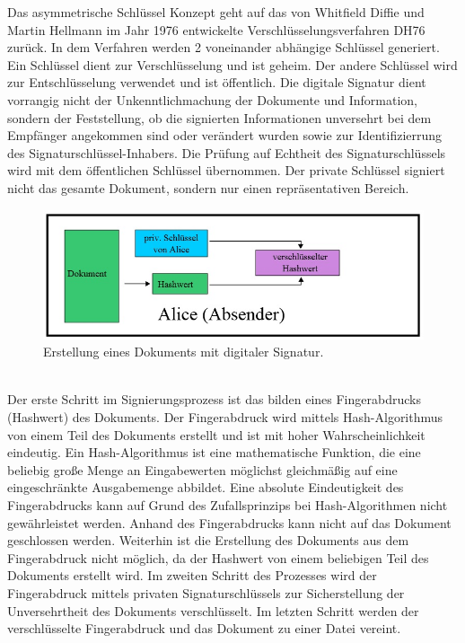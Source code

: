 Das asymmetrische Schlüssel Konzept geht auf das von Whitfield Diffie 
und Martin Hellmann im Jahr 1976 entwickelte Verschlüsselungsverfahren 
DH76 zurück. In dem Verfahren werden 2 voneinander abhängige Schlüssel 
generiert. Ein Schlüssel dient zur Verschlüsselung und ist geheim. Der 
andere Schlüssel wird zur Entschlüsselung verwendet und ist öffentlich. 
Die digitale Signatur dient vorrangig nicht der Unkenntlichmachung der 
Dokumente und Information, sondern der Feststellung, ob die signierten 
Informationen unversehrt bei dem Empfänger angekommen sind oder verändert 
wurden sowie zur Identifizierrung des Signaturschlüssel-Inhabers. Die 
Prüfung auf Echtheit des Signaturschlüssels wird mit dem öffentlichen 
Schlüssel übernommen. Der private Schlüssel signiert nicht das gesamte 
Dokument, sondern nur einen repräsentativen Bereich. \cite{techno1}
\begin{figure}[!ht]
    \centering
    \includegraphics[width=\textwidth]{ErstellungAbsender2.jpg}
    \caption[Erstellung eines Dokuments mit digitaler Signatur]{\small{Erstellung eines Dokuments mit digitaler Signatur. \cite{techno3}}}
    \label{fig:2}
\end{figure}\\
Der erste Schritt im Signierungsprozess ist das bilden eines Fingerabdrucks (Hashwert) des Dokuments. Der Fingerabdruck wird mittels Hash-Algorithmus von einem Teil des Dokuments erstellt und ist mit hoher Wahrscheinlichkeit eindeutig. Ein Hash-Algorithmus ist eine mathematische Funktion, die eine beliebig große Menge an Eingabewerten möglichst gleichmäßig auf eine eingeschränkte Ausgabemenge abbildet. \cite{techno2} Eine absolute Eindeutigkeit des Fingerabdrucks kann auf Grund des Zufallsprinzips bei Hash-Algorithmen nicht gewährleistet werden. Anhand des Fingerabdrucks kann nicht auf das Dokument geschlossen werden. Weiterhin ist die Erstellung des Dokuments aus dem Fingerabdruck nicht möglich, da der Hashwert von einem beliebigen Teil des Dokuments erstellt wird. Im zweiten Schritt des Prozesses wird der Fingerabdruck mittels privaten Signaturschlüssels zur Sicherstellung der Unversehrtheit des Dokuments verschlüsselt. Im letzten Schritt werden der verschlüsselte Fingerabdruck und das Dokument zu einer Datei vereint. \cite{techno1}   